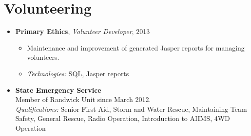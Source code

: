 
\vspace{-0.6cm}
\section*{Volunteering}
\vspace{-0.2cm}


\begin{itemize}
\item \textbf{Primary Ethics}, \textit{Volunteer Developer}, 2013
\begin{itemize}
  \item Maintenance and improvement of generated Jasper reports for 
  managing volunteers.
  \item \textit{Technologies:} SQL, Jasper reports
\end{itemize}

\item \textbf{State Emergency Service} \\ 
Member of Randwick Unit since March 2012.\\ 
\textit{Qualifications:} Senior First Aid, Storm and Water Rescue,
Maintaining Team Safety, General Rescue, Radio Operation, Introduction to AIIMS,
4WD Operation  

\end{itemize}
